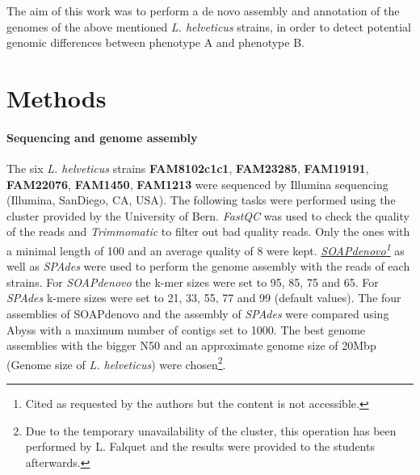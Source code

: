 \documentclass[10pt,a4paper]{article}
\begin{document}
\noindent The aim of this work was to perform a de novo assembly and annotation of the genomes of the above mentioned \textit{L. helveticus} strains, in order to detect potential genomic differences between phenotype A and phenotype B.

\section*{\large Methods}

\paragraph{Sequencing and genome assembly}
The six \textit{L. helveticus} strains \textbf{FAM8102c1c1}, \textbf{FAM23285}, \textbf{FAM19191}, \textbf{FAM22076}, \textbf{FAM1450}, \textbf{FAM1213}  were sequenced by Illumina sequencing (Illumina, SanDiego, CA, USA). The following tasks were performed using the cluster provided by the University of Bern.  \textit{FastQC}\cite{andrews2012} was used to check the quality of the reads and \textit{Trimmomatic}\cite{bolger_trimmomatic:_2014} to filter out bad quality reads. Only the ones with a minimal length of 100 and an average quality of 8 were kept. \textit{\href{http://www.gigasciencejournal.com/content/1/1/18/}{SOAPdenovo}\footnote{Cited as requested by the authors but the content is not accessible.}} as well as \textit{SPAdes}\cite{hutchison_assembling_2013} were used to perform the genome assembly with the reads of each strains. For \textit{SOAPdenovo} the k-mer sizes were set to 95, 85, 75 and 65. For \textit{SPAdes} k-mere sizes were set to 21, 33, 55, 77 and 99 (default values). The four assemblies of SOAPdenovo and the assembly of \textit{SPAdes} were compared using Abyss\cite{simpson_abyss:_2009} with a maximum number of contigs set to 1000. The best genome assemblies with the bigger N50 and an approximate genome size of 20Mbp (Genome size of \textit{L. helveticus}) were chosen\footnote{Due to the temporary unavailability of the cluster, this operation has been performed by L. Falquet and the results were provided to the students afterwards.}.
\end{document}
